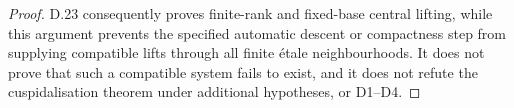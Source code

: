 \begin{proof}
D.23 consequently proves finite-rank and fixed-base central
lifting, while this argument prevents the specified automatic
descent or compactness step from supplying compatible lifts through
all finite étale neighbourhoods.  It does not prove that such a
compatible system fails to exist, and it does not refute the
cuspidalisation theorem under additional hypotheses, or D1--D4.
\end{proof}
